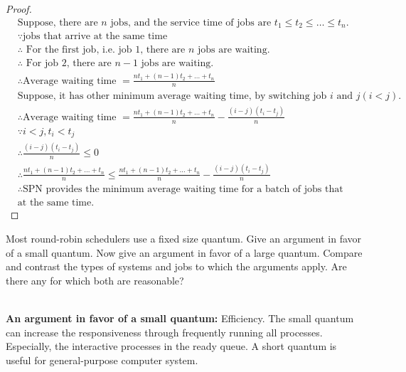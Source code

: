 \documentclass[12pt]{article}
\newenvironment{sol}[1][Solution]{\begin{trivlist}\item[\hskip\labelsep {\bfseries #1:}]}{\end{trivlist}}
\begin{document}
\begin{enumerate}
\begin{sol}
\begin{proof}
            \begin{align*}
             & \text{Suppose, there are } n \text{ jobs, and the service time of jobs are } t_1 \leq t_2 \leq \dots \leq t_n.\\
                & \because \text{jobs that arrive at the same time} \\
                & \therefore \text{ For the first job, i.e. job 1, there are } n \text{ jobs are waiting.} \\
                & \therefore \text{ For job 2, there are } n-1 \text{ jobs are waiting.}\\
                & \therefore \text{Average waiting time } = \frac{n t_1+(n-1)t_2+\dots + t_n}{n} \\
                & \text{Suppose, it has other minimum average waiting time, by switching job } i \text{ and } j (i < j).\\
                & \therefore \text{Average waiting time } = \frac{n t_1+(n-1)t_2+\dots + t_n}{n} - \frac{(i-j)(t_i-t_j)}{n}\\
                & \because i < j, t_i<t_j\\
                & \therefore \frac{(i-j)(t_i-t_j)}{n} \leq 0 \\
                & \therefore \frac{n t_1+(n-1)t_2+\dots + t_n}{n} \leq \frac{n t_1+(n-1)t_2+\dots + t_n}{n} - \frac{(i-j)(t_i-t_j)}{n} \\
                & \therefore \text{SPN provides the minimum average waiting time for a batch of jobs that arrive}\\
                & \text{at the same time.}
            \end{align*}
        \end{proof}
    \end{sol}

    \newpage
    \item Most round-robin schedulers use a fixed size quantum. Give an argument in favor of a small quantum. Now give an argument in favor of a large quantum. Compare and contrast the types of systems and jobs to which the arguments apply. Are there any for which both are reasonable?
    \begin{sol}
    \hspace*{\fill}\\
    \textbf{An argument in favor of a small quantum:} Efficiency. The small quantum can increase the responsiveness through frequently running all processes. Especially, the interactive processes in the ready queue. A short quantum is useful for general-purpose computer system. \\
    

\end{sol}
\end{enumerate}
\end{document}
